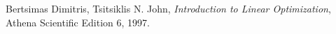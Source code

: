 \documentclass[twoside,12pt]{article}
\begin{document}

\begin{thebibliography}{9}

  Bertsimas Dimitris, Tsitsiklis N. John,
  \emph{Introduction to Linear Optimization},
  Athena Scientific Edition 6,
  1997.

\end{thebibliography}
\end{document}
